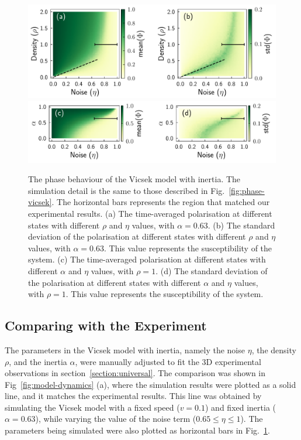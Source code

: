 \documentclass[11pt,twoside]{report}
\begin{document}
\begin{figure}
  \includegraphics[width=\linewidth]{phase-vicsek-inertia}
  \includegraphics[width=\linewidth]{phase-vicsek-alpha-200}
  \caption[The phase behaviour of the Vicsek model with inertia]{
  The phase behaviour of the Vicsek model with inertia. The simulation detail is the same to those described in Fig.~\ref{fig:phase-vicsek}. The horizontal bars represents the region that matched our experimental results.
  (a) The time-averaged polarisation at different states with different $\rho$ and $\eta$ values, with $\alpha=0.63$.
  (b) The standard deviation of the polarisation at different states with different $\rho$ and $\eta$ values, with $\alpha=0.63$. This value represents the susceptibility of the system.
  (c) The time-averaged polarisation at different states with different $\alpha$ and $\eta$ values, with $\rho=1$.
  (d) The standard deviation of the polarisation at different states with different $\alpha$ and $\eta$ values, with $\rho=1$. This value represents the susceptibility of the system.
  }
  \label{fig:phase-vicsek-inertia}
\end{figure}



\subsection{Comparing with the Experiment}

The parameters in the Vicsek model with inertia, namely the noise $\eta$, the density $\rho$, and the inertia $\alpha$, were manually adjusted to fit the 3D experimental observations in section~\ref{section:universal}. The comparison was shown in Fig~\ref{fig:model-dynamics} (a), where the simulation results were plotted as a solid line, and it matches the experimental results. This line was obtained by simulating the Vicsek model with a fixed speed ($v = 0.1$) and fixed inertia ($\alpha=0.63$), while varying the value of the noise term ($0.65 \le \eta \le 1$). The parameters being simulated were also plotted as horizontal bars in Fig.~\ref{fig:phase-vicsek-inertia}.
\end{document}
